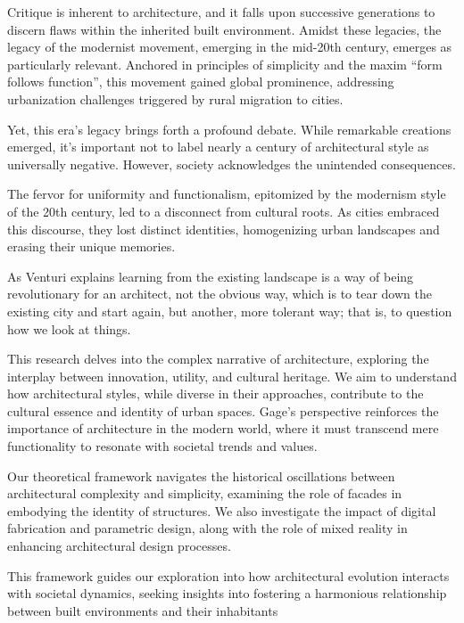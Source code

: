Critique is inherent to architecture, and it falls upon successive generations to discern flaws within the inherited built environment.
Amidst these legacies, the legacy of the modernist movement, emerging in the mid-20th century, emerges as particularly relevant.
Anchored in principles of simplicity and the maxim ``form follows function'', this movement gained global prominence, addressing urbanization challenges triggered by rural migration to cities.

Yet, this era's legacy brings forth a profound debate.
While remarkable creations emerged, it's important not to label nearly a century of architectural style as universally negative.
However, society acknowledges the unintended consequences.

The fervor for uniformity and functionalism, epitomized by the modernism style of the 20th century, led to a disconnect from cultural roots.
As cities embraced this discourse, they lost distinct identities, homogenizing urban landscapes and erasing their unique memories.

As Venturi\cite{Venturi1972} explains learning from  the existing landscape  is  a  way of being revolutionary for  an  architect, not the obvious way, which is to tear down the existing city and start again, but another, more tolerant way;
that is, to question how we look at things.

This research delves into the complex narrative of architecture, exploring the interplay between innovation, utility, and cultural heritage.
We aim to understand how architectural styles, while diverse in their approaches, contribute to the cultural essence and identity of urban spaces.
Gage's\cite{Gage2015} perspective reinforces the importance of architecture in the modern world, where it must transcend mere functionality to resonate with societal trends and values.

Our theoretical framework navigates the historical oscillations between architectural complexity and simplicity, examining the role of facades in embodying the identity of structures.
We also investigate the impact of digital fabrication and parametric design, along with the role of mixed reality in enhancing architectural design processes.

This framework guides our exploration into how architectural evolution interacts with societal dynamics, seeking insights into fostering a harmonious relationship between built environments and their inhabitants



